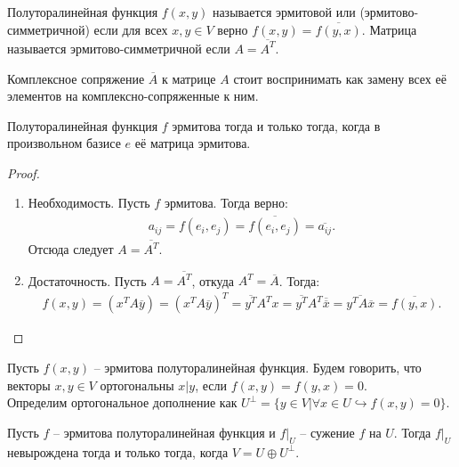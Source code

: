 \begin{definition}
    Полуторалинейная функция $f(x, y)$ называется эрмитовой или (эрмитово-симметричной) если для всех 
    $x, y \in V$ верно $f(x, y) = \overline{f(y, x)}$. Матрица называется эрмитово-симметричной если 
    $A = \overline{A^T}$. 
\end{definition}

\begin{note}
    Комплексное сопряжение $\overline{A}$ к матрице $A$ стоит воспринимать как замену всех её элементов 
    на комплексно-сопряженные к ним.
\end{note}

\begin{proposition}
    Полуторалинейная функция $f$ эрмитова тогда и только тогда, когда в произвольном базисе $e$ её 
    матрица эрмитова.
\end{proposition}

\begin{proof}~
    \begin{enumerate}
        \item Необходимость. Пусть $f$ эрмитова. Тогда верно: \begin{gather*}
            a_{ij} = f(e_i, e_j) = \overline{f(e_i, e_j)} = \overline{a_{ij}}.
        \end{gather*} Отсюда следует $A = \overline{A^T}$.
        \item Достаточность. Пусть $A = \overline{A^T}$, откуда $A^T = \overline{A}$.
        Тогда: 
        \begin{gather*}
            f(x, y) = (x^T A \overline{y}) = (x^T A \overline{y})^T = \overline{y^T} A^T x = 
            \overline{y^T} A^T \overline{\overline{x}} = \overline{y^T A \overline{x}} = \overline{f(y, x)}.
        \end{gather*}
    \end{enumerate}
\end{proof}

\begin{definition}
    Пусть $f(x, y)$ -- эрмитова полуторалинейная функция. Будем говорить, что векторы $x, y \in V$ 
    ортогональны $x \vert y$, если $f(x, y) = f(y, x) = 0$. \\ 
    Определим ортогональное дополнение как   
    $U^{\perp} = \{y \in V \vert \forall x \in U \hookrightarrow f(x, y) = 0\}$.
\end{definition}

\begin{theorem}
    Пусть $f$ -- эрмитова полуторалинейная функция  и $f \vert_{U}$ -- сужение $f$ на $U$.
    Тогда $f \vert_{U}$ невырождена тогда и только тогда, когда $V = U \oplus U^{\perp}$.
\end{theorem}

